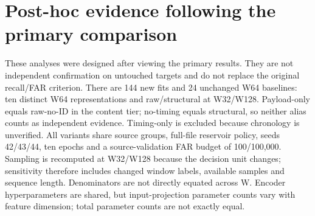 \documentclass[12pt,a4paper,oneside,openany]{extbook}
\begin{document}
\section{Post-hoc evidence following the primary comparison}\label{sec:completion}
These analyses were designed after viewing the primary results. They are not independent confirmation on untouched targets and do not replace the original recall/FAR criterion. There are 144 new fits and 24 unchanged W64 baselines: ten distinct W64 representations and raw/structural at W32/W128. Payload-only equals raw-no-ID in the content tier; no-timing equals structural, so neither alias counts as independent evidence. Timing-only is excluded because chronology is unverified.
All variants share source groups, full-file reservoir policy, seeds 42/43/44, ten epochs and a source-validation FAR budget of 100/100,000. Sampling is recomputed at W32/W128 because the decision unit changes; sensitivity therefore includes changed window labels, available samples and sequence length. Denominators are not directly equated across W.
Encoder hyperparameters are shared, but input-projection parameter counts vary with feature dimension; total parameter counts are not exactly equal.
\end{document}
